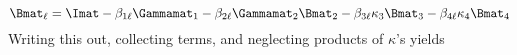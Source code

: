 \begin{equation}
\Bmat_\ell = \Imat - \beta_{1\ell}\Gammamat_1  - \beta_{2\ell} \Gammamat_2 \Bmat_2  - \beta_{3\ell}\kappa_3 \Bmat_{3} - \beta_{4\ell} \kappa_{4} \Bmat_{4}
\end{equation}
Writing this out, collecting terms, and neglecting products of $\kappa$'s yields